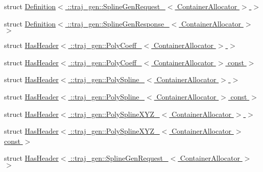 \begin{DoxyCompactItemize}
\item 
struct \hyperlink{structros_1_1message__traits_1_1_definition_3_01_1_1traj__gen_1_1_spline_gen_request___3_01_container_allocator_01_4_01_4}{Definition$<$ \+::traj\+\_\+gen\+::\+Spline\+Gen\+Request\+\_\+$<$ Container\+Allocator $>$ $>$}
\item 
struct \hyperlink{structros_1_1message__traits_1_1_definition_3_01_1_1traj__gen_1_1_spline_gen_response___3_01_container_allocator_01_4_01_4}{Definition$<$ \+::traj\+\_\+gen\+::\+Spline\+Gen\+Response\+\_\+$<$ Container\+Allocator $>$ $>$}
\item 
struct \hyperlink{structros_1_1message__traits_1_1_has_header_3_01_1_1traj__gen_1_1_poly_coeff___3_01_container_allocator_01_4_01_4}{Has\+Header$<$ \+::traj\+\_\+gen\+::\+Poly\+Coeff\+\_\+$<$ Container\+Allocator $>$ $>$}
\item 
struct \hyperlink{structros_1_1message__traits_1_1_has_header_3_01_1_1traj__gen_1_1_poly_coeff___3_01_container_allocator_01_4_01const_01_01_4}{Has\+Header$<$ \+::traj\+\_\+gen\+::\+Poly\+Coeff\+\_\+$<$ Container\+Allocator $>$ const  $>$}
\item 
struct \hyperlink{structros_1_1message__traits_1_1_has_header_3_01_1_1traj__gen_1_1_poly_spline___3_01_container_allocator_01_4_01_4}{Has\+Header$<$ \+::traj\+\_\+gen\+::\+Poly\+Spline\+\_\+$<$ Container\+Allocator $>$ $>$}
\item 
struct \hyperlink{structros_1_1message__traits_1_1_has_header_3_01_1_1traj__gen_1_1_poly_spline___3_01_container_allocator_01_4_01const_01_01_4}{Has\+Header$<$ \+::traj\+\_\+gen\+::\+Poly\+Spline\+\_\+$<$ Container\+Allocator $>$ const  $>$}
\item 
struct \hyperlink{structros_1_1message__traits_1_1_has_header_3_01_1_1traj__gen_1_1_poly_spline_x_y_z___3_01_container_allocator_01_4_01_4}{Has\+Header$<$ \+::traj\+\_\+gen\+::\+Poly\+Spline\+X\+Y\+Z\+\_\+$<$ Container\+Allocator $>$ $>$}
\item 
struct \hyperlink{structros_1_1message__traits_1_1_has_header_3_01_1_1traj__gen_1_1_poly_spline_x_y_z___3_01_conta12af5fbc53800516b6d924908e03fe26}{Has\+Header$<$ \+::traj\+\_\+gen\+::\+Poly\+Spline\+X\+Y\+Z\+\_\+$<$ Container\+Allocator $>$ const  $>$}
\item 
struct \hyperlink{structros_1_1message__traits_1_1_has_header_3_01_1_1traj__gen_1_1_spline_gen_request___3_01_container_allocator_01_4_01_4}{Has\+Header$<$ \+::traj\+\_\+gen\+::\+Spline\+Gen\+Request\+\_\+$<$ Container\+Allocator $>$ $>$}
\item 

\end{DoxyCompactItemize}
